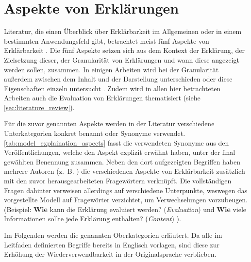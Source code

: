 \section{Aspekte von Erklärungen}
\label{sec:model_explanation_aspects}

Literatur, die einen Überblick über Erklärbarkeit im Allgemeinen oder in einem bestimmten Anwendungsfeld gibt, betrachtet meist fünf Aspekte von Erklärbarkeit \cite{rosenfeld_explainability_2019, nunes_systematic_2017,chazette_knowledge_nodate}. Die fünf Aspekte setzen sich aus dem Kontext der Erklärung, der Zielsetzung dieser, der Granularität von Erklärungen und wann diese angezeigt werden sollen, zusammen. In einigen Arbeiten wird bei der Granularität außerdem zwischen dem Inhalt und der Darstellung unterschieden oder diese Eigenschaften einzeln untersucht \cite{nunes_systematic_2017,abdulrahman_belief-based_2019}. Zudem wird in allen hier betrachteten Arbeiten auch die Evaluation von Erklärungen thematisiert (siehe \autoref{sec:literature_review}).

Für die zuvor genannten Aspekte werden in der Literatur verschiedene Unterkategorien konkret benannt oder Synonyme verwendet. \autoref{tab:model_explaination_aspects} fasst die verwendeten Synonyme aus den Veröffentlichungen, welche den Aspekt explizit erwähnt haben, unter der final gewählten Benennung zusammen. Neben den dort aufgezeigten Begriffen haben mehrere Autoren (z.~B. \cite{rosenfeld_explainability_2019, chazette2020explainability}) die verschiedenen Aspekte von Erklärbarkeit zusätzlich mit den zuvor herausgearbeiteten Fragewörtern verknüpft. Die vollständigen Fragen dahinter verweisen allerdings auf verschiedene Unterpunkte, weswegen das vorgestellte Modell auf Fragewörter verzichtet, um Verwechselungen vorzubeugen. (Beispiel: \glqq \textbf{Wie} kann die Erklärung evaluiert werden?\grqq{} (\textit{Evaluation}) \cite[vgl.][]{rosenfeld_explainability_2019} und \glqq \textbf{Wie} viele Informationen sollte jede Erklärung enthalten?\grqq{} (\textit{Content}) \cite[vgl.][]{kouki_user_2017}).

\bigskip

Im Folgenden werden die genannten Oberkategorien erläutert. Da alle im Leitfaden definierten Begriffe bereits in Englisch vorlagen, sind diese zur Erhöhung der Wiederverwendbarkeit in der Originalsprache verblieben. 

